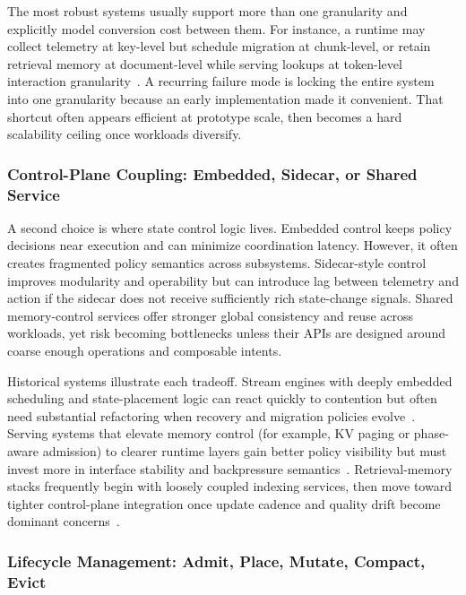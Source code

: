 \documentclass[acmsmall,screen,review]{acmart}
\begin{document}
The most robust systems usually support more than one granularity and explicitly model conversion cost between them. For instance, a runtime may collect telemetry at key-level but schedule migration at chunk-level, or retain retrieval memory at document-level while serving lookups at token-level interaction granularity~\cite{khattab2020colbert}. A recurring failure mode is locking the entire system into one granularity because an early implementation made it convenient. That shortcut often appears efficient at prototype scale, then becomes a hard scalability ceiling once workloads diversify.

\subsubsection{Control-Plane Coupling: Embedded, Sidecar, or Shared Service}

A second choice is where state control logic lives. Embedded control keeps policy decisions near execution and can minimize coordination latency. However, it often creates fragmented policy semantics across subsystems. Sidecar-style control improves modularity and operability but can introduce lag between telemetry and action if the sidecar does not receive sufficiently rich state-change signals. Shared memory-control services offer stronger global consistency and reuse across workloads, yet risk becoming bottlenecks unless their APIs are designed around coarse enough operations and composable intents.

Historical systems illustrate each tradeoff. Stream engines with deeply embedded scheduling and state-placement logic can react quickly to contention but often need substantial refactoring when recovery and migration policies evolve~\cite{zhang2020concurrent,zhao2024recovery}. Serving systems that elevate memory control (for example, KV paging or phase-aware admission) to clearer runtime layers gain better policy visibility but must invest more in interface stability and backpressure semantics~\cite{kwon2023pagedattention,agrawal2024sarathi,holmes2024fastgen}. Retrieval-memory stacks frequently begin with loosely coupled indexing services, then move toward tighter control-plane integration once update cadence and quality drift become dominant concerns~\cite{karpukhin2020dpr,zhang2026flowrag}.

\subsubsection{Lifecycle Management: Admit, Place, Mutate, Compact, Evict}
\end{document}
